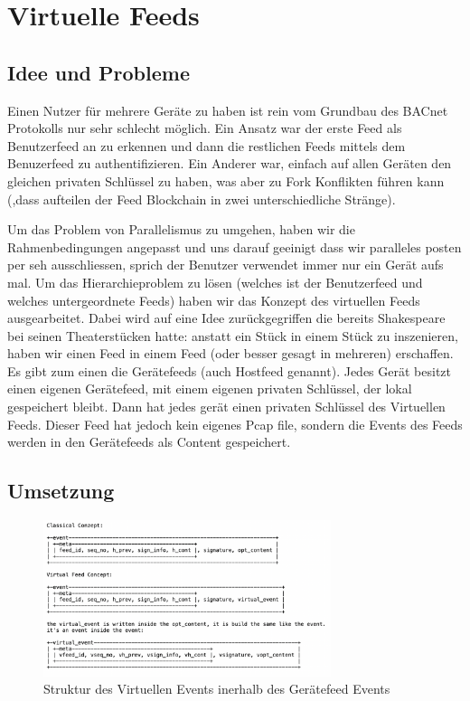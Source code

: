 \documentclass[a4paper,titlepage]{article}
\begin{document}
\section{Virtuelle Feeds}

\subsection{Idee und Probleme}
Einen Nutzer für mehrere Geräte zu haben ist rein vom Grundbau des BACnet Protokolls nur sehr schlecht möglich. Ein Ansatz war der erste Feed als Benutzerfeed an zu erkennen und dann die restlichen Feeds mittels dem Benuzerfeed zu authentifizieren. Ein Anderer war, einfach auf allen Geräten den gleichen privaten Schlüssel zu haben, was aber zu Fork Konflikten führen kann (,dass aufteilen der Feed Blockchain in zwei unterschiedliche Stränge).

Um das Problem von Parallelismus zu umgehen, haben wir die Rahmenbedingungen angepasst und uns darauf geeinigt dass wir paralleles posten per seh ausschliessen, sprich der Benutzer verwendet immer nur ein Gerät aufs mal. Um das Hierarchieproblem zu lösen (welches ist der Benutzerfeed und welches untergeordnete Feeds) haben wir das Konzept des virtuellen Feeds ausgearbeitet. Dabei wird auf eine Idee zurückgegriffen die bereits Shakespeare bei seinen Theaterstücken hatte: anstatt ein Stück in einem Stück zu inszenieren, haben wir einen Feed in einem Feed (oder besser gesagt in mehreren) erschaffen. Es gibt zum einen die Gerätefeeds (auch Hostfeed genannt). Jedes Gerät besitzt einen eigenen Gerätefeed, mit einem eigenen privaten Schlüssel, der lokal gespeichert bleibt. Dann hat jedes gerät einen privaten Schlüssel des Virtuellen Feeds. Dieser Feed hat jedoch kein eigenes Pcap file, sondern die Events des Feeds werden in den Gerätefeeds als Content gespeichert.

\subsection{Umsetzung}

\begin{figure}[h!]
   \centering
   \includegraphics[width=0.75\textwidth]{figures/vFeedStructure}  
   \caption*{Struktur des Virtuellen Events inerhalb des Gerätefeed Events }
   \label{fig-virtual_event_structure}
\end{figure}
\end{document}
